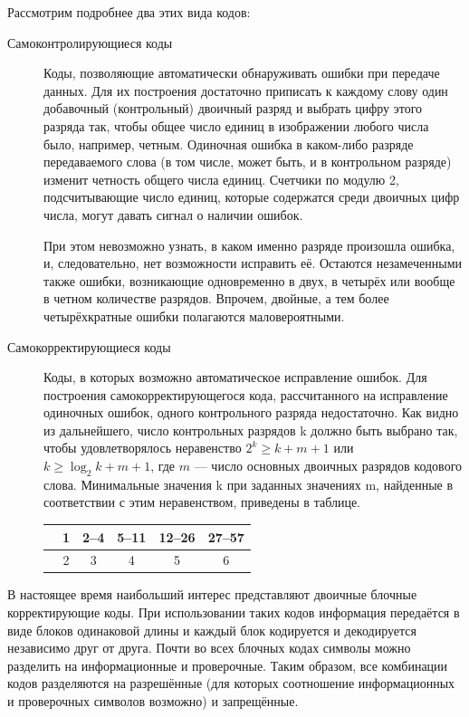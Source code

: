\bigskip\noindent
Рассмотрим подробнее два этих вида кодов:
\begin{description}
    \item [Самоконтролирующиеся коды]
          Коды, позволяющие автоматически обнаруживать ошибки при передаче данных. Для их построения достаточно приписать к каждому слову один добавочный (контрольный) двоичный разряд и выбрать цифру этого разряда так, чтобы общее число единиц в изображении любого числа было, например, четным. Одиночная ошибка в каком-либо разряде передаваемого слова (в том числе, может быть, и в контрольном разряде) изменит четность общего числа единиц. Счетчики по модулю 2, подсчитывающие число единиц, которые содержатся среди двоичных цифр числа, могут давать сигнал о наличии ошибок.

          При этом невозможно узнать, в каком именно разряде произошла ошибка, и, следовательно, нет возможности исправить её. Остаются незамеченными также ошибки, возникающие одновременно в двух, в четырёх или вообще в четном количестве разрядов. Впрочем, двойные, а тем более четырёхкратные ошибки полагаются маловероятными.

    \item [Самокорректирующиеся коды]
          Коды, в которых возможно автоматическое исправление ошибок. Для построения самокорректирующегося кода, рассчитанного на исправление одиночных ошибок, одного контрольного разряда недостаточно. Как видно из дальнейшего, число контрольных разрядов k должно быть выбрано так, чтобы удовлетворялось неравенство $2^k \ge k+m+1$ или $k \ge \log_2{k+m+1}$, где $m$ --- число основных двоичных разрядов кодового слова. Минимальные значения k при заданных значениях m, найденные в соответствии с этим неравенством, приведены в таблице.

          \begin{table}[H]
              \centering
              \begin{tabularx}{0.8\linewidth}{|r|C|C|C|C|C|}
                  \hline
                   & 1 & \numrange{2}{4} & \numrange{5}{11} & \numrange{12}{26} & \numrange{27}{57} \\ \hline
                   & 2 & 3    & 4     & 5      & 6      \\ \hline
              \end{tabularx}
          \end{table}
\end{description}

В настоящее время наибольший интерес представляют двоичные блочные корректирующие коды. При использовании таких кодов информация передаётся в виде блоков одинаковой длины и каждый блок кодируется и декодируется независимо друг от друга. Почти во всех блочных кодах символы можно разделить на информационные и проверочные. Таким образом, все комбинации кодов разделяются на разрешённые (для которых соотношение информационных и проверочных символов возможно) и запрещённые.


